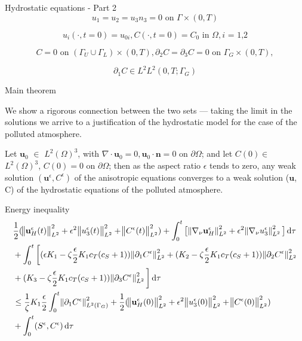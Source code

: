 \documentclass{beamer}
\newcommand*\diff{\mathop{}\!\mathrm{d}}
\begin{document}
\begin{frame}{Hydrostatic equations - Part 2}
    \[ u_1 = u_2 = u_3 n_3 = 0 \text{ on } \Gamma \times (0,T) \]
    
    \[ u_i (\cdot, t=0) = u_{0 i}, C (\cdot, t=0) = C_0 \text{ in } \Omega, \text{$i$ = 1,2} \]
    
    $$C = 0 \text{ on } ( \Gamma_U \cup \Gamma_L) \times (0,T), \partial_2 C = \partial_3 C = 0 \text{ on } \Gamma_G \times (0,T),$$
    
    $$ \partial_1 C \in L^2 L^2 (0,T; \Gamma_G) $$
  
\end{frame}

\begin{frame}{Main theorem}

  We show a rigorous connection between the two sets --- taking the limit in the solutions we arrive to a justification of the hydrostatic model for the case of the polluted atmosphere.

  \begin{theorem}

  Let $\mathbf{u}_0$ $\in$ $L^2 (\Omega)^3$, with $\nabla \cdot \mathbf{u}_0 = 0, \mathbf{u}_0 \cdot \mathbf{n} = 0$ on $\partial \Omega$; and let $C(0)\in$ $L^2 (\Omega)^3$, $C(0) = 0$ on $ \partial \Omega$; then as the aspect ratio $\epsilon$ tends to zero, any weak solution $(\mathbf{u}^\epsilon, C^\epsilon)$ of the anisotropic equations converges to a weak solution ($\mathbf{u}$, C) of the hydrostatic equations of the polluted atmosphere.

  \end{theorem}

\end{frame}

\begin{frame}{Energy inequality}
    \changefontsizes{10pt}
  \begin{equation*}
    \begin{split}  
    & \frac{1}{2} (\norm{\mathbf{u}_H^\epsilon (t)}_{L^2}^2 + \epsilon ^ 2 \norm{u_3^\epsilon (t)}_{L^2}^2 + \norm{C^\epsilon (t)}_{L^2}^2) + \int_0 ^ t \big [\norm{\nabla_\nu \mathbf{u}_H^\epsilon}_{L^2}^2 + \epsilon ^ 2 \norm{\nabla_\nu u_3^\epsilon}_{L^2}^2 \big ] \diff \tau \\
    & + \int_0 ^ t \bigg[ (\epsilon K_1 - \zeta \frac{\epsilon}{2} K_1 c_T (c_S + 1)) \norm{\partial_1 C^\epsilon}_{L^2}^2  + (K_2 - \zeta \frac{\epsilon}{2} K_1 c_T (c_S + 1)) \norm{\partial_2 C^\epsilon}_{L^2}^2 \\
    & + (K_3 - \zeta \frac{\epsilon}{2} K_1 c_T (c_S + 1)) \norm{\partial_3 C^\epsilon}_{L^2}^2 \bigg] \diff \tau \\
    & \leq \frac{1}{\zeta} K_1 \frac{\epsilon}{2} \int_0 ^ t \norm{\partial_1 C^\epsilon}^2 _{L^2 (\Gamma_G)} + \frac{1}{2} (\norm{\mathbf{u}_H^\epsilon (0)}_{L^2}^2 + \epsilon ^ 2 \norm{u_3^\epsilon (0)}_{L^2}^2 + \norm{C^\epsilon (0)}_{L^2}^2) \\
    & + \int_0^t (S^\epsilon,C^\epsilon) \diff \tau
    \end{split}
  \end{equation*}
\end{frame}
\end{document}
